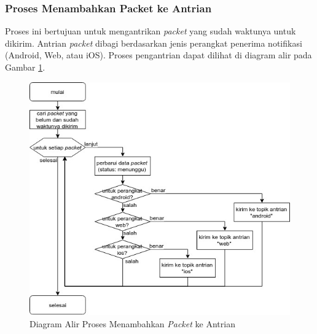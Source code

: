 \subsubsection{Proses Menambahkan Packet ke Antrian}
\label{3:proses_menambahkan_packet_ke_antrian}
\par Proses ini bertujuan untuk mengantrikan \textit{packet} yang sudah waktunya untuk dikirim.
Antrian \textit{packet} dibagi berdasarkan jenis perangkat penerima notifikasi (Android, Web, atau iOS). Proses pengantrian dapat dilihat di diagram alir pada Gambar \ref{flowchart_menambahkan_packet_ke_antrian}.
\begin{figure}[H]
	\centering\includegraphics[width=1\textwidth]{bab3/img/flowchart-menambahkan_packet_ke_antrian.jpg}
	\caption{Diagram Alir Proses Menambahkan \textit{Packet} ke Antrian} \label{flowchart_menambahkan_packet_ke_antrian}
\end{figure}

\clearpage

